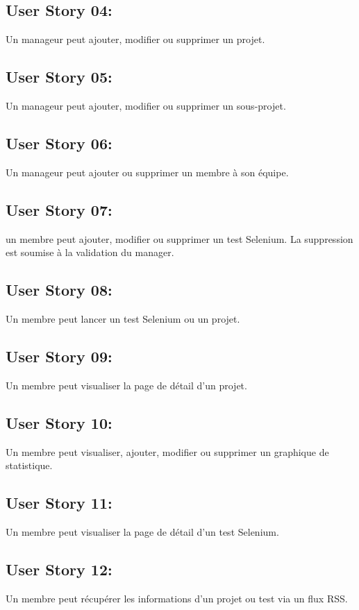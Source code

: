 	\subsection{User Story 04:}
	Un manageur peut ajouter, modifier ou supprimer un projet.
	
	\subsection{User Story 05:}
	Un manageur peut ajouter, modifier ou supprimer un sous-projet.
	
	\subsection{User Story 06:}
	Un manageur peut ajouter ou supprimer un membre à son équipe.
	
	\subsection{User Story 07:}
	un membre peut ajouter, modifier ou supprimer un test Selenium. La suppression est soumise à la validation
	du manager.
	
	\subsection{User Story 08:}
	Un membre peut lancer un test Selenium ou un projet.
	
	
	\subsection{User Story 09:}
	Un membre peut visualiser la page de détail d'un projet.
	
	\subsection{User Story 10:}
	Un membre peut  visualiser, ajouter, modifier ou supprimer un graphique de statistique.
	
	\subsection{User Story 11:}
	Un membre peut visualiser la page de détail d'un test Selenium.
	
	\subsection{User Story 12:}
	Un membre peut récupérer les informations d'un projet ou test via un flux RSS.

